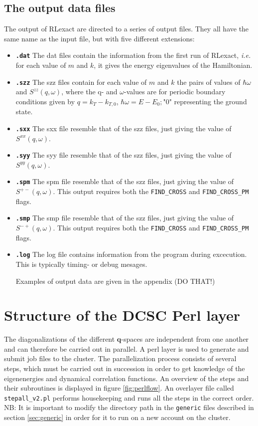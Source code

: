 \documentclass{article}
\begin{document}
\subsection{The output data files} \label{sect:datafiles}
The output of RLexact are directed to a series of output files. They all have the same name as the input file, but with five different extensions:
\begin{itemize}
\item {\bf \verb+.dat+} The dat files contain the information from the first run of RLexact, {\em i.e.} for each value of $m$ and $k$,
it gives the energy eigenvalues of the Hamiltonian.
\item {\bf \verb+.szz+} The szz files contain for each value of $m$ and $k$ the pairs of values of $\hbar \omega$ and $S^{zz}(q,\omega)$,
where the q- and $\omega$-values are for periodic boundary conditions given by $q = k_T - k_{T,0}$, $\hbar \omega = E - E_0; $"0" representing the ground state.
\item {\bf \verb+.sxx+} The sxx file resemble that of the szz files, just giving the value of $S^{xx}(q,\omega)$.
\item {\bf \verb+.syy+} The syy file resemble that of the szz files, just giving the value of $S^{yy}(q,\omega)$.
\item {\bf \verb+.spm+} The spm file resemble that of the szz files, just giving the value of $S^{+-}(q,\omega)$. This output requires both the \texttt{FIND\_CROSS} and \texttt{FIND\_CROSS\_PM} flags.
\item {\bf \verb+.smp+} The smp file resemble that of the szz files, just giving the value of $S^{-+}(q,\omega)$. This output requires both the \texttt{FIND\_CROSS} and \texttt{FIND\_CROSS\_PM} flags.
\item {\bf \verb+.log+} The log file contains information from the program during excecution. This is typically timing- or debug mesages.

Examples of output data are given in the appendix (DO THAT!)

\end{itemize}

\section{Structure of the DCSC Perl layer} \label{sec:Perl}
The diagonalizations of the different $\textbf{q}$-spaces are independent from one another and can therefore be carried out in parallel. A perl layer is used to generate and submit job files to the cluster. The parallelization process consists of several steps, which must be carried out in succession in order to get knowledge of the eigenenergies and dynamical correlation functions. An overview of the steps and their subroutines is displayed in figure \ref{fig:perlflow}. An overlayer file called \texttt{stepall\_v2.pl} performs housekeeping and runs all the steps in the correct order. NB: It is important to modify the directory path in the \texttt{generic} files described in section \ref{sec:generic} in order for it to run on a new account on the cluster. \\
	
\end{document}

